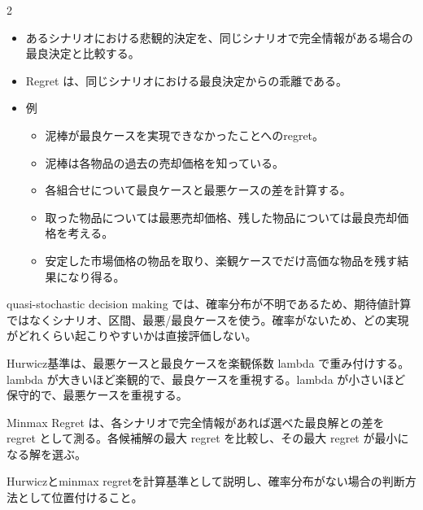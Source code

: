 \clearpage



\vspace{1.5mm}

\begin{multicols}{2}

\footnotesize

\raggedcolumns


\begin{itemize}
\item あるシナリオにおける悲観的決定を、同じシナリオで完全情報がある場合の最良決定と比較する。
\item Regret は、同じシナリオにおける最良決定からの乖離である。
\item 例
\begin{itemize}
\item 泥棒が最良ケースを実現できなかったことへのregret。
\item 泥棒は各物品の過去の売却価格を知っている。
\item 各組合せについて最良ケースと最悪ケースの差を計算する。
\item 取った物品については最悪売却価格、残した物品については最良売却価格を考える。
\item 安定した市場価格の物品を取り、楽観ケースでだけ高価な物品を残す結果になり得る。
\end{itemize}
\end{itemize}

quasi-stochastic decision making では、確率分布が不明であるため、期待値計算ではなくシナリオ、区間、最悪/最良ケースを使う。確率がないため、どの実現がどれくらい起こりやすいかは直接評価しない。\par

Hurwicz基準は、最悪ケースと最良ケースを楽観係数 lambda で重み付けする。lambda が大きいほど楽観的で、最良ケースを重視する。lambda が小さいほど保守的で、最悪ケースを重視する。\par

Minmax Regret は、各シナリオで完全情報があれば選べた最良解との差を regret として測る。各候補解の最大 regret を比較し、その最大 regret が最小になる解を選ぶ。\par

Hurwiczとminmax regretを計算基準として説明し、確率分布がない場合の判断方法として位置付けること。\par


\end{multicols}
